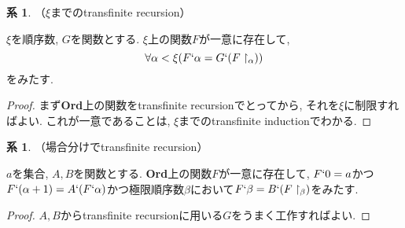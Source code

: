 \documentclass[a4paper, twoside]{bxjsarticle}
\theoremstyle{definition}
\newtheorem{cor}[thm]{系}
\begin{document}
    \begin{cor}
        （$\xi$までのtransfinite recursion）
        
        $\xi$を順序数, $G$を関数とする. $\xi$上の関数$F$が一意に存在して, \[\forall \alpha<\xi(F`\alpha = G`(F\restriction_\alpha))\]をみたす.
    \end{cor}
    \begin{proof}
        まず\textbf{Ord}上の関数をtransfinite recursionでとってから, それを$\xi$に制限すればよい. これが一意であることは, $\xi$までのtransfinite inductionでわかる.
    \end{proof}
    \begin{cor}
        （場合分けでtransfinite recursion）
        
        $a$を集合, $A, B$を関数とする. \textbf{Ord}上の関数$F$が一意に存在して, $F`0 = a$かつ$F`(\alpha+1)=A`(F`\alpha)$かつ極限順序数$\beta$において$F`\beta=B`(F\restriction_\beta)$をみたす.
    \end{cor}
    \begin{proof}
        $A, B$からtransfinite recursionに用いる$G$をうまく工作すればよい.
    \end{proof}
    
\end{document}
